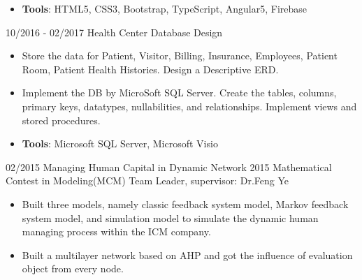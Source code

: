 \documentclass[letterpaper]{twentysecondcv} %
\begin{document}
\begin{twenty}
{{\begin{itemize}
				is also well designed for responsive pages, which is suitable for using JaJang on both PC and mobile platform.
				\item \textbf{Tools}: HTML5, CSS3, Bootstrap, TypeScript, Angular5, Firebase \vspace{2mm}
		\end{itemize}}
	}
	\twentyitem
	{10/2016}
	{- 02/2017}
	{Health Center Database Design}
	{}
	{}
	{
		{\begin{itemize}
				\item Store the data for Patient, Visitor, Billing, Insurance, Employees, Patient Room, Patient Health Histories. Design a Descriptive ERD.
				\item Implement the DB by MicroSoft SQL Server. Create the tables, columns, primary keys, datatypes, nullabilities, and relationships. Implement views and stored procedures.
				\item \textbf{Tools}: Microsoft SQL Server, Microsoft Visio\vspace{2mm}
		\end{itemize}}		
	}
	\twentyitem
	{02/2015}
	{}
	{Managing Human Capital in Dynamic Network}
	{2015 Mathematical Contest in Modeling(MCM)}
	{Team Leader, supervisor: Dr.Feng Ye}
	{
		{\begin{itemize}
				\item Built three models, namely classic feedback system model, Markov feedback system model, and simulation model to simulate the dynamic human managing process within the ICM company.
				\item Built a multilayer network based on AHP and got the influence of evaluation object from every node.
		\end{itemize}}
	}
\end{twenty}
\newpage
{}
\end{document}

